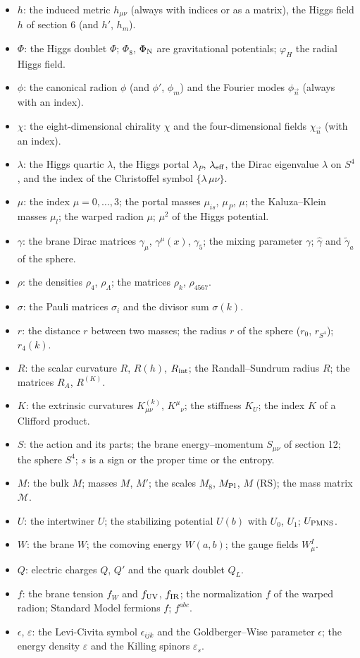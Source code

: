 \documentclass[10pt,a4paper]{article}
\begin{document}
\begin{itemize}
\item $h$: the induced metric $h_{\mu\nu}$ (always with indices or as a matrix), the Higgs field $h$ of section 6 (and $h'$, $h_m$).
\item $\Phi$: the Higgs doublet $\Phi$; $\Phi_8$, $\Phi_{\rm N}$ are gravitational potentials; $\varphi_H$ the radial Higgs field.
\item $\phi$: the canonical radion $\phi$ (and $\phi'$, $\phi_m$) and the Fourier modes $\phi_{\vec n}$ (always with an index).
\item $\chi$: the eight-dimensional chirality $\chi$ and the four-dimensional fields $\chi_{\vec n}$ (with an index).
\item $\lambda$: the Higgs quartic $\lambda$, the Higgs portal $\lambda_P$, $\lambda_{\rm eff}$, the Dirac eigenvalue $\lambda$ on $S^4$, and the index of the Christoffel symbol $\{\lambda\,\mu\nu\}$.
\item $\mu$: the index $\mu=0,\dots,3$; the portal masses $\mu_{is}$, $\mu_P$, $\mu$; the Kaluza–Klein masses $\mu_l$; the warped radion $\mu$; $\mu^2$ of the Higgs potential.
\item $\gamma$: the brane Dirac matrices $\gamma_\mu$, $\gamma^\mu(x)$, $\gamma_5$; the mixing parameter $\gamma$; $\hat\gamma$ and $\tilde\gamma_a$ of the sphere.
\item $\rho$: the densities $\rho_4$, $\rho_\Lambda$; the matrices $\rho_k$, $\rho_{4567}$.
\item $\sigma$: the Pauli matrices $\sigma_i$ and the divisor sum $\sigma(k)$.
\item $r$: the distance $r$ between two masses; the radius $r$ of the sphere ($r_0$, $r_{S^4}$); $r_4(k)$.
\item $R$: the scalar curvature $R$, $R(h)$, $R_{\rm int}$; the Randall–Sundrum radius $R$; the matrices $R_A$, $R^{(K)}$.
\item $K$: the extrinsic curvatures $K^{(k)}_{\mu\nu}$, $K^\mu{}_\nu$; the stiffness $K_U$; the index $K$ of a Clifford product.
\item $S$: the action and its parts; the brane energy–momentum $S_{\mu\nu}$ of section 12; the sphere $S^4$; $s$ is a sign or the proper time or the entropy.
\item $M$: the bulk $M$; masses $M$, $M'$; the scales $M_8$, $M_{\rm Pl}$, $M$ (RS); the mass matrix $\mathcal M$.
\item $U$: the intertwiner $U$; the stabilizing potential $U(b)$ with $U_0$, $U_1$; $U_{\rm PMNS}$.
\item $W$: the brane $W$; the comoving energy $W(a,b)$; the gauge fields $W^I_\mu$.
\item $Q$: electric charges $Q$, $Q'$ and the quark doublet $Q_L$.
\item $f$: the brane tension $f_W$ and $f_{\rm UV}$, $f_{\rm IR}$; the normalization $f$ of the warped radion; Standard Model fermions $f$; $f^{abc}$.
\item $\epsilon$, $\varepsilon$: the Levi-Civita symbol $\epsilon_{ijk}$ and the Goldberger–Wise parameter $\epsilon$; the energy density $\varepsilon$ and the Killing spinors $\varepsilon_s$.
\end{itemize}
\end{document}
